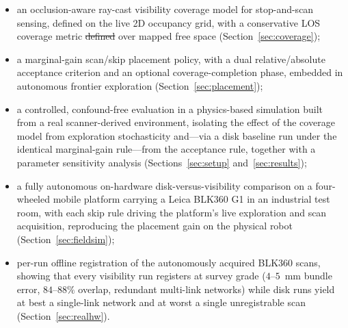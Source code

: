 \documentclass[sensors,article,submit,pdftex,moreauthors]{Definitions/mdpi}
\providecommand{\DIFadd}[1]{{\protect\color{blue} \sf #1}} %
\providecommand{\DIFdel}[1]{{\protect\color{red}\protect\scriptsize\protect\sout{#1}}} %
\providecommand{\DIFaddbegin}{} %
\providecommand{\DIFaddend}{} %
\providecommand{\DIFdelbegin}{} %
\providecommand{\DIFdelend}{} %
\begin{document}
\begin{itemize}[leftmargin=*,labelsep=4.5mm]
\item an occlusion-aware ray-cast visibility coverage model for stop-and-scan
sensing, \DIFaddbegin \DIFadd{defined on the live 2D occupancy grid, }\DIFaddend with a conservative LOS
coverage metric \DIFdelbegin \DIFdel{defined }\DIFdelend over mapped free space (Section~\ref{sec:coverage});
\item a marginal-gain scan/skip placement policy, with a dual relative/absolute
acceptance criterion and an optional coverage-completion phase, embedded in
autonomous frontier exploration (Section~\ref{sec:placement});
\item a controlled, confound-free evaluation in a physics-based simulation built
from a real scanner-derived environment, isolating the effect of the coverage
model from exploration stochasticity \DIFaddbegin \DIFadd{and---via a disk baseline run under the
identical marginal-gain rule---from the acceptance rule}\DIFaddend , together with a
parameter sensitivity analysis (Sections~\ref{sec:setup}
and~\ref{sec:results});
\item a fully autonomous on-hardware disk-versus-visibility comparison on a
four-wheeled mobile platform carrying a Leica BLK360 G1 in an industrial test
room, with each skip rule driving the platform's live exploration and scan
acquisition, reproducing the placement gain on the physical robot
(Section~\ref{sec:fieldsim});
\item per-run offline registration of the autonomously acquired BLK360 scans,
showing that every visibility run registers at survey grade ($4$--$5$~mm bundle
error, $84$--$88\%$ overlap, redundant multi-link networks) while disk runs
yield at best a single-link network and at worst a single unregistrable scan
(Section~\ref{sec:realhw}).
\end{itemize}
\end{document}
